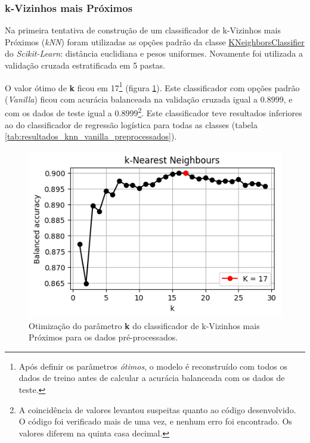 \documentclass[final,5p]{elsarticle}
\numberwithin{equation}{section}
\begin{document}
    \subsubsection{k-Vizinhos mais Próximos}

        Na primeira tentativa de construção de um classificador de k-Vizinhos mais Próximos (\emph{kNN}) foram utilizadas as opções padrão da classe \href{https://scikit-learn.org/stable/modules/generated/sklearn.neighbors.KNeighborsClassifier.html}{KNeighborsClassifier} do \emph{Scikit-Learn}: distância euclidiana e pesos uniformes. Novamente foi utilizada a validação cruzada estratificada em 5 pastas.

        O valor ótimo de \textbf{k} ficou em 17\footnote{Após definir os parâmetros \emph{ótimos}, o modelo é reconstruído com todos os dados de treino antes de calcular a acurácia balanceada com os dados de teste.} (figura \ref{fig:knn_melhor_k_preprocessados}). Este classificador com opções padrão (\emph{Vanilla}) ficou com acurácia balanceada na validação cruzada igual a $0.8999$, e com os dados de teste igual a $0.8999$\footnote{A coincidência de valores levantou suspeitas quanto ao código desenvolvido. O código foi verificado mais de uma vez, e nenhum erro foi encontrado. Os valores diferem na quinta casa decimal.}. Este classificador teve resultados inferiores ao do classificador de regressão logística para todas as classes (tabela \ref{tab:resultados_knn_vanilla_preprocessados}).

        \begin{figure}[hbt!]
            \includegraphics[width=0.95\columnwidth]{A_kNN_bestK.png}
            \caption{Otimização do parâmetro \textbf{k} do classificador de k-Vizinhos mais Próximos para os dados pré-processados.}
            \label{fig:knn_melhor_k_preprocessados}
        \end{figure}
\end{document}
